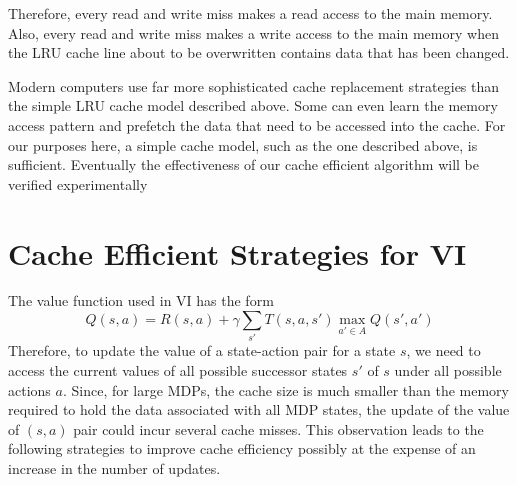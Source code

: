 \documentclass[conference]{IEEEtran}
\begin{document}
Therefore, every read and write miss makes a read access to the main memory. Also, every read and write miss makes a write access to the main memory when the LRU cache line about to be overwritten contains data that has been changed.

Modern computers use far more sophisticated cache replacement strategies than the simple LRU cache model described above. Some can even learn the memory access pattern and prefetch the data that need to be accessed into the cache. For our
purposes here, a simple cache model, such as the one described above, is sufficient. Eventually the effectiveness of our cache efficient algorithm will be verified experimentally

\section{Cache Efficient Strategies for VI}
\label{sec:CacheStrategies}
The value function used in VI has the form
\begin{equation}
Q(s,a)=R(s,a) + \gamma \sum\limits_{s'} T(s,a,s')  {\displaystyle\max_{a'\in A} }  Q(s',a') \label{eq}
\end{equation}
Therefore, to update the value of a state-action pair for a state $s$,
we need to access the current values of all possible successor states $s'$ of $s$ under all possible actions $a$.
Since, for large MDPs, the cache size is much smaller than the memory
required to hold the data associated with all MDP states, the update of the value of $(s,a)$ pair could incur several cache misses.
This observation leads to the following strategies to improve cache efficiency possibly at the expense of an increase in the number of updates.
\end{document}
